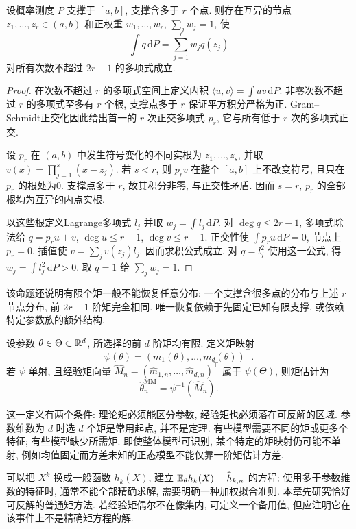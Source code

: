 \begin{proposition}[Gaussian求积的矩匹配]
设概率测度 $P$ 支撑于 $[a,b]$, 支撑含多于 $r$ 个点. 则存在互异的节点 $z_1,\ldots,z_r\in(a,b)$ 和正权重 $w_1,\ldots,w_r$, $\sum_jw_j=1$, 使
\[
 \int q\,\mathrm dP=\sum_{j=1}^rw_jq(z_j)
\]
对所有次数不超过 $2r-1$ 的多项式成立.
\end{proposition}
\begin{proof}
在次数不超过 $r$ 的多项式空间上定义内积 $\langle u,v\rangle=\int uv\,\mathrm dP$. 非零次数不超过 $r$ 的多项式至多有 $r$ 个根, 支撑点多于 $r$ 保证平方积分严格为正. Gram--Schmidt正交化因此给出首一的 $r$ 次正交多项式 $p_r$, 它与所有低于 $r$ 次的多项式正交.

设 $p_r$ 在 $(a,b)$ 中发生符号变化的不同实根为 $z_1,\ldots,z_s$, 并取 $v(x)=\prod_{j=1}^s(x-z_j)$. 若 $s<r$, 则 $p_rv$ 在整个 $[a,b]$ 上不改变符号, 且只在 $p_r$ 的根处为0. 支撑点多于 $r$, 故其积分非零, 与正交性矛盾. 因而 $s=r$, $p_r$ 的全部根均为互异的内点实根.

以这些根定义Lagrange多项式 $l_j$ 并取 $w_j=\int l_j\,\mathrm dP$. 对 $\deg q\le2r-1$, 多项式除法给 $q=p_r u+v$, $\deg u\le r-1$, $\deg v\le r-1$. 正交性使 $\int p_ru\,\mathrm dP=0$, 节点上 $p_r=0$, 插值使 $v=\sum_jv(z_j)l_j$. 因而求积公式成立. 对 $q=l_j^2$ 使用这一公式, 得 $w_j=\int l_j^2\,\mathrm dP>0$. 取 $q=1$ 给 $\sum_jw_j=1$.
\end{proof}
该命题还说明有限个矩一般不能恢复任意分布: 一个支撑含很多点的分布与上述 $r$ 节点分布, 前 $2r-1$ 阶矩完全相同. 唯一恢复依赖于先固定已知有限支撑, 或依赖特定参数族的额外结构.

\begin{definition}[矩估计]
设参数 $\theta\in\Theta\subset\mathbb R^d$, 所选择的前 $d$ 阶矩均有限. 定义矩映射
\[
 \psi(\theta)=(m_1(\theta),\ldots,m_d(\theta))^\top.
\]
若 $\psi$ 单射, 且经验矩向量 $\widehat M_n=(\widehat m_{1,n},\ldots,\widehat m_{d,n})^\top$ 属于 $\psi(\Theta)$, 则矩估计为
\[
 \widehat\theta_n^{\mathrm{MM}}=\psi^{-1}(\widehat M_n).
\]
\end{definition}
这一定义有两个条件: 理论矩必须能区分参数, 经验矩也必须落在可反解的区域. 参数维数为 $d$ 时选 $d$ 个矩是常用起点, 并不是定理. 有些模型需要不同的矩或更多个特征; 有些模型缺少所需矩. 即使整体模型可识别, 某个特定的矩映射仍可能不单射, 例如均值固定而方差未知的正态模型不能仅靠一阶矩估计方差.

可以把 $X^k$ 换成一般函数 $h_k(X)$, 建立 $\mathbb E_\theta h_k(X)=\widehat h_{k,n}$ 的方程; 使用多于参数维数的特征时, 通常不能全部精确求解, 需要明确一种加权拟合准则. 本章先研究恰好可反解的普通矩方法. 若经验矩偶尔不在像集内, 可定义一个备用值, 但应注明它在该事件上不是精确矩方程的解.

